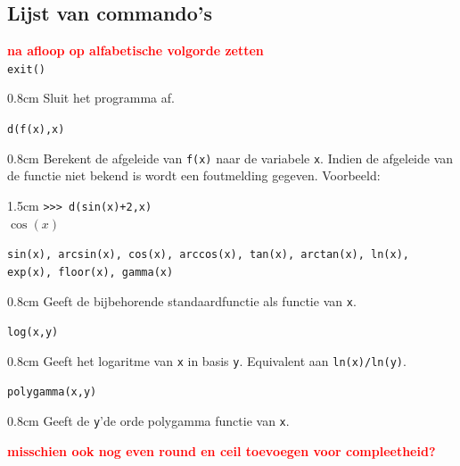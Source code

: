 \documentclass[a4paper]{article}
\newcommand{\rcom}[1]{\textbf{\textcolor{red}{#1}}}
\newcommand{\com}[2]{\texttt{#1}\mbox{}\vspace{-2ex}\begin{adjustwidth}{0.8cm}{} #2 \end{adjustwidth}}
\begin{document}
\subsection{Lijst van commando's}
\rcom{na afloop op alfabetische volgorde zetten\\}
\com{exit()}{Sluit het programma af.}
\com{d(f(x),x)}{Berekent de afgeleide van \texttt{f(x)} naar de variabele \texttt{x}. Indien de afgeleide van de functie niet bekend is wordt een foutmelding gegeven. Voorbeeld:\vspace{-0.5ex}}
\begin{adjustwidth}{1.5cm}{}
\texttt{>>> d(sin(x)+2,x)}\\
$\cos(x)$
\end{adjustwidth}

\com{sin(x), arcsin(x), cos(x), arccos(x), tan(x), arctan(x), ln(x), exp(x), floor(x), gamma(x)}{Geeft de bijbehorende standaardfunctie als functie van \texttt{x}.}
\com{log(x,y)}{Geeft het logaritme van \texttt{x} in basis \texttt{y}. Equivalent aan \texttt{ln(x)/ln(y)}.}
\com{polygamma(x,y)}{Geeft de \texttt{y}'de orde polygamma functie van \texttt{x}.}

\rcom{misschien ook nog even round en ceil toevoegen voor compleetheid?}
\end{document}
